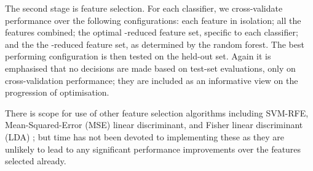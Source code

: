             The second stage is feature selection. For each classifier, we cross-validate performance over the following configurations: each feature in isolation; all the features combined; the optimal -reduced feature set, specific to each classifier; and the the -reduced feature set, as determined by the random forest. The best performing configuration is then tested on the held-out set. Again it is emphasised that no decisions are made based on test-set evaluations, only on cross-validation performance; they are included as an informative view on the progression of optimisation.
            
            There is scope for use of other feature selection algorithms including SVM-RFE, Mean-Squared-Error (MSE) linear discriminant, and Fisher linear discriminant (LDA) \cite{Guyon2002}; but time has not been devoted to implementing these as they are unlikely to lead to any significant performance improvements over the features selected already.
            
            
